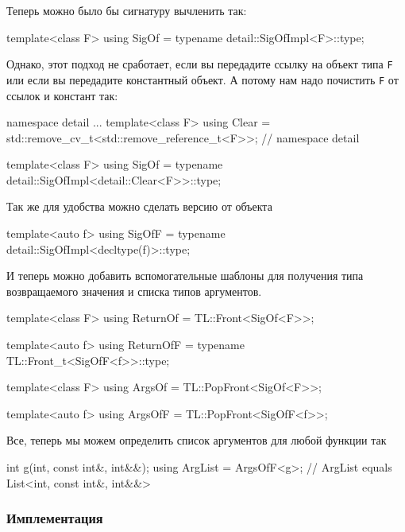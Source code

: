 Теперь можно было бы сигнатуру вычленить так:
\begin{cppcode}[\nonumbers]
template<class F>
using SigOf = typename detail::SigOfImpl<F>::type;
\end{cppcode}
Однако, этот подход не сработает, если вы передадите ссылку на объект типа \verb"F" или если вы передадите константный объект.
А потому нам надо почистить \verb"F" от ссылок и констант так:
\begin{cppcode}
namespace detail {
...
template<class F>
using Clear = std::remove_cv_t<std::remove_reference_t<F>>;
} // namespace detail

template<class F>
using SigOf = typename detail::SigOfImpl<detail::Clear<F>>::type;
\end{cppcode}
Так же для удобства можно сделать версию от объекта
\begin{cppcode}[\nonumbers]
template<auto f>
using SigOfF = typename detail::SigOfImpl<decltype(f)>::type;
\end{cppcode}
И теперь можно добавить вспомогательные шаблоны для получения типа возвращаемого значения и списка типов аргументов.
\begin{cppcode}[\nonumbers]
template<class F>
using ReturnOf = TL::Front<SigOf<F>>;

template<auto f>
using ReturnOfF = typename TL::Front_t<SigOfF<f>>::type;

template<class F>
using ArgsOf = TL::PopFront<SigOf<F>>;

template<auto f>
using ArgsOfF = TL::PopFront<SigOfF<f>>;
\end{cppcode}
Все, теперь мы можем определить список аргументов для любой функции так
\begin{cppcode}
int g(int, const int&, int&&);
using ArgList = ArgsOfF<g>;
// ArgList equals List<int, const int&, int&&>
\end{cppcode}

\subsubsection{Имплементация}

